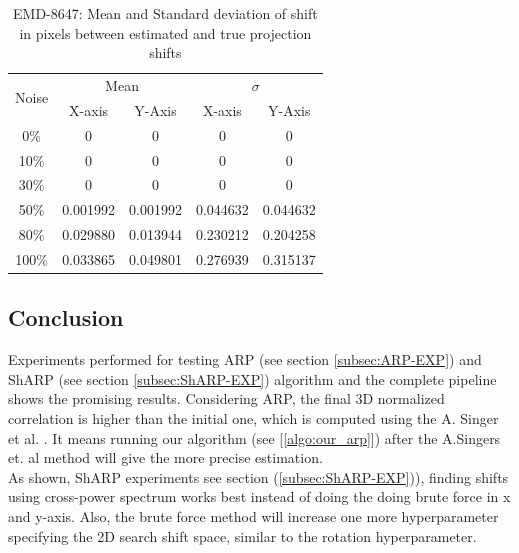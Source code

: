 \documentclass[twoside]{iitbreport}
\begin{document}
\begin{table}[H]
    \centering
     \begin{tabular}{||c|c|c|c|c||} 
             \hline
            \multirow{2}{*}{Noise} 
             & \multicolumn{2}{c|}{Mean} 
             & \multicolumn{2}{c|}{$\sigma$} \\
             \cline{2-5}
             & X-axis & Y-Axis & X-axis & Y-Axis\\
            \hline\hline
            0\%   & 0 & 0 & 0 & 0 \\\hline
            10\%  &0 & 0 & 0 & 0 \\\hline
            30\%  &0 & 0 & 0 & 0 \\\hline
            50\%  &0.001992 & 0.001992 & 0.044632 & 0.044632 \\\hline
            80\%  &0.029880 & 0.013944 & 0.230212 & 0.204258 \\\hline
            100\% &0.033865 & 0.049801 & 0.276939 & 0.315137 \\\hline
            \hline
    \end{tabular}
    \captionsetup{justification=centering}
    \caption{EMD-8647: Mean and Standard deviation of shift in pixels between estimated and true projection shifts}
    \label{tbl:our_sharp_8647_result-trans-error}
\end{table}

\subsection{Conclusion}

Experiments performed for testing ARP (see section \ref{subsec:ARP-EXP}) and ShARP (see section \ref{subsec:ShARP-EXP}) algorithm and the complete pipeline shows the promising results. Considering ARP, the final 3D normalized correlation is higher than the initial one, which is computed using the A. Singer et al. \cite{singer2009threeAngleEstimate}. It means running our algorithm (see [\ref{algo:our_arp}]) after the A.Singers et. al \cite{singer2009threeAngleEstimate} method will give the more precise estimation. \\

As shown, ShARP experiments see section (\ref{subsec:ShARP-EXP})), finding shifts using cross-power spectrum works best instead of doing the doing brute force in x and y-axis. Also, the brute force method will increase one more hyperparameter specifying the 2D search shift space, similar to the rotation hyperparameter.  \\
\end{document}

